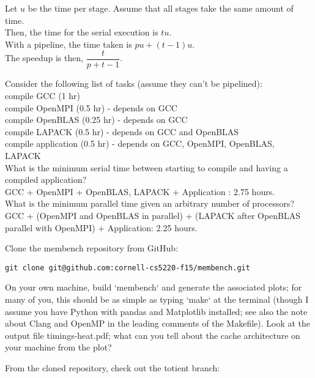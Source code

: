 \documentclass{5220hw}
\begin{document}
\begin{exercises}
Let $u$ be the time per stage. Assume that all stages take the same amount of time. \\
Then, the time for the serial execution is $tu$. \\
With a pipeline, the time taken is $pu + (t-1)u$. \\
The speedup is then, $\dfrac{t}{p + t -1}$. \\

\item Consider the following list of tasks (assume they can't be pipelined): \\

compile GCC (1 hr) \\
compile OpenMPI (0.5 hr) - depends on GCC \\
compile OpenBLAS (0.25 hr) - depends on GCC \\
compile LAPACK (0.5 hr) - depends on GCC and OpenBLAS \\
compile application (0.5 hr) - depends on GCC, OpenMPI, OpenBLAS, LAPACK \\

What is the minimum serial time between starting to compile and having a compiled application? \\
GCC + OpenMPI + OpenBLAS, LAPACK + Application : 2.75 hours. \\ 
What is the minimum parallel time given an arbitrary number of processors? \\
GCC + (OpenMPI and OpenBLAS in parallel) + (LAPACK after OpenBLAS parallel with OpenMPI) + Application: 2.25 hours. \\

\item Clone the membench repository from GitHub:
\begin{lstlisting}
git clone git@github.com:cornell-cs5220-f15/membench.git
\end{lstlisting}

On your own machine, build `membench` and generate the associated plots; for many of you, this should be as simple as typing `make` at the terminal (though I assume you have Python with pandas and Matplotlib installed; see also the note about Clang and OpenMP in the leading comments of the Makefile).  Look at the output file timings-heat.pdf; what can you tell about the cache architecture on your machine from the plot?

\item From the cloned repository, check out the totient branch:


\end{exercises}
\end{document}
